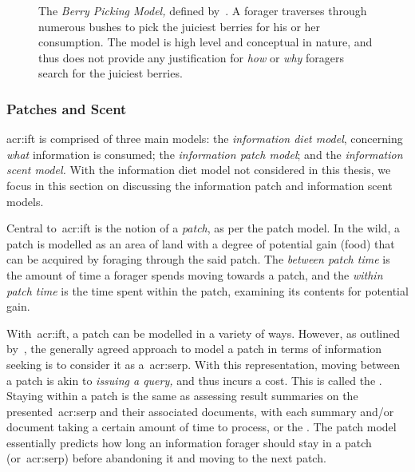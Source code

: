 \begin{figure}[t!]
    \centering
    \caption[The Berry Picking Model~\cite{bates1989berry_picking}]{The \emph{Berry Picking Model,} defined by~\cite{bates1989berry_picking}. A forager traverses through numerous bushes to pick the juiciest berries for his or her consumption. The model is high level and conceptual in nature, and thus does not provide any justification for \emph{how} or \emph{why} foragers search for the juiciest berries.}
    \label{fig:berry_picking}
\end{figure}

\subsubsection{Patches and Scent}\label{sec:stopping_background:theoretical:ift:patch}
\gls{acr:ift} is comprised of three main models: the \emph{information diet model}, concerning \emph{what} information is consumed; the \emph{information patch model}; and the \emph{information scent model.} With the information diet model not considered in this thesis, we focus in this section on discussing the information patch and information scent models.

Central to~\gls{acr:ift} is the notion of a \emph{patch}, as per the patch model. In the wild, a patch is modelled as an area of land with a degree of potential gain (food) that can be acquired by foraging through the said patch. The \emph{between patch time} is the amount of time a forager spends moving towards a patch, and the \emph{within patch time} is the time spent within the patch, examining its contents for potential gain.

With~\gls{acr:ift}, a patch can be modelled in a variety of ways. However, as outlined by~\cite{azzopardi2015theories}, the generally agreed approach to model a patch in terms of information seeking is to consider it as a~\gls{acr:serp}. With this representation, moving between a patch is akin to \emph{issuing a query,} and thus incurs a cost. This is called the . Staying within a patch is the same as assessing result summaries on the presented~\gls{acr:serp} and their associated documents, with each summary and/or document taking a certain amount of time to process, or the . The patch model essentially predicts how long an information forager should stay in a patch (or~\gls{acr:serp}) before abandoning it and moving to the next patch.


